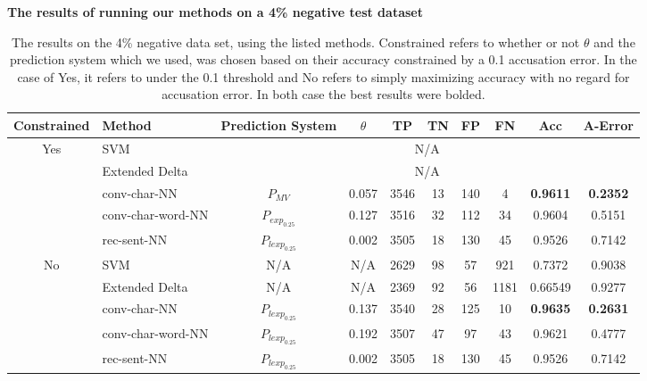 \begin{table}[]
\centering
\textbf{The results of running our methods on a 4\% negative test dataset}\par\medskip
\begin{adjustbox}{center}
\begin{tabular}{|c|l|c|c|c|c|c|c|c|c|}
\hline
Constrained                & Method                  & Prediction System      & $\theta$ & TP  & TN & FP & FN  & Acc             & A-Error         \\ \hline
\multirow{5}{*}{Yes} & SVM                     & \multicolumn{8}{c|}{N/A}                                                                   \\ \cline{2-10} 
                     & Extended Delta          & \multicolumn{8}{c|}{N/A}                                                                   \\ \cline{2-10} 
                     & \gls{conv-char-NN}      & $P_{MV}$          & 0.057    & 3546 & 13  & 140 & 4    & \textbf{0.9611} & \textbf{0.2352} \\ \cline{2-10} 
                     & \gls{conv-char-word-NN} & $P_{exp_{0.25}}$  & 0.127    & 3516 & 32  & 112 & 34   & 0.9604          & 0.5151          \\ \cline{2-10} 
                     & \gls{rec-sent-NN}       & $P_{lexp_{0.25}}$ & 0.002    & 3505 & 18  & 130 & 45   & 0.9526          & 0.7142          \\ \hline\hline
\multirow{5}{*}{No}  & SVM                     & N/A               & N/A      & 2629 & 98  & 57  & 921  & 0.7372          & 0.9038          \\ \cline{2-10} 
                     & Extended Delta          & N/A               & N/A      & 2369 & 92  & 56  & 1181 & 0.66549         & 0.9277          \\ \cline{2-10} 
                     & \gls{conv-char-NN}      & $P_{lexp_{0.25}}$ & 0.137    & 3540 & 28  & 125 & 10   & \textbf{0.9635} & \textbf{0.2631} \\ \cline{2-10} 
                     & \gls{conv-char-word-NN} & $P_{lexp_{0.25}}$ & 0.192    & 3507 & 47  & 97  & 43   & 0.9621          & 0.4777          \\ \cline{2-10} 
                     & \gls{rec-sent-NN}       & $P_{lexp_{0.25}}$ & 0.002    & 3505 & 18  & 130 & 45   & 0.9526          & 0.7142          \\ \hline
\end{tabular}
\end{adjustbox}
\caption{The results on the 4\% negative data set, using the listed methods.
Constrained refers to whether or not $\theta$ and the prediction system which we
used, was chosen based on their accuracy constrained by a 0.1 accusation error.
In the case of Yes, it refers to under the 0.1 threshold and No refers to simply
maximizing accuracy with no regard for accusation error. In both case
the best results were bolded.}
\label{tab:04_results}
\end{table}
